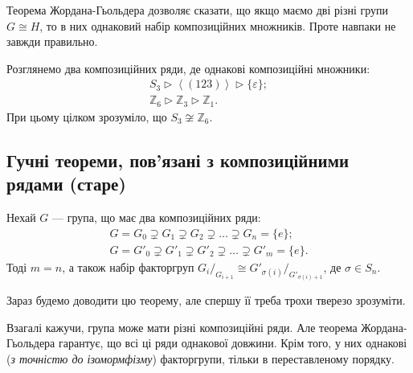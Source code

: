 \documentclass{math_library}
\begin{document}
\begin{remark}
Теорема Жордана-Гьольдера дозволяє сказати, що якщо маємо дві різні групи $G \cong H$, то в них однаковий набір композиційних множників. Проте навпаки не завжди правильно.
\end{remark}

\begin{example}
Розглянемо два композиційних ряди, де однакові композиційні множники:
\begin{align*}
S_3 \triangleright \left< (123) \right> \triangleright \{\varepsilon\}; \\
\mathbb{Z}_6 \triangleright \mathbb{Z}_3 \triangleright \mathbb{Z}_1.
\end{align*}
При цьому цілком зрозуміло, що $S_3 \not\cong \mathbb{Z}_6$.
\end{example}

\iffalse
\subsection{Гучні теореми, пов'язані з композиційними рядами (старе)}
\begin{theorem}
Нехай $G$ --- група, що має два композиційних ряди:
\begin{align*}
G = G_0 \supsetneq G_1 \supsetneq G_2 \supsetneq \dots \supsetneq G_n = \{e\}; \\
G = G'_0 \supsetneq G'_1 \supsetneq G'_2 \supsetneq \dots \supsetneq G'_m = \{e\}.
\end{align*}
Тоді $m = n$, а також набір факторгруп ${G_i}/_{G_{i+1}} \cong G'_{\sigma(i)}/_{G'_{\sigma(i)+1}}$, де $\sigma \in S_n$.
\end{theorem}

Зараз будемо доводити цю теорему, але спершу її треба трохи тверезо зрозуміти.

\begin{remark}
Взагалі кажучи, група може мати різні композиційні ряди. Але теорема Жордана-Гьольдера гарантує, що всі ці ряди однакової довжини. Крім того, у них однакові (\textit{з точністю до ізомормфізму}) факторгрупи, тільки в переставленому порядку.
\end{remark}
\end{document}
